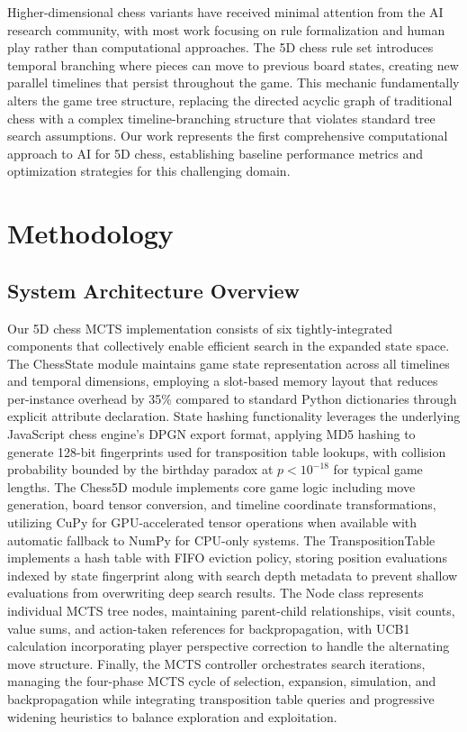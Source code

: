 \documentclass{article}
\begin{document}
Higher-dimensional chess variants have received minimal attention from the AI research community, with most work focusing on rule formalization and human play rather than computational approaches. The 5D chess rule set introduces temporal branching where pieces can move to previous board states, creating new parallel timelines that persist throughout the game. This mechanic fundamentally alters the game tree structure, replacing the directed acyclic graph of traditional chess with a complex timeline-branching structure that violates standard tree search assumptions. Our work represents the first comprehensive computational approach to AI for 5D chess, establishing baseline performance metrics and optimization strategies for this challenging domain.


\section{Methodology}

\subsection{System Architecture Overview}

Our 5D chess MCTS implementation consists of six tightly-integrated components that collectively enable efficient search in the expanded state space. The ChessState module maintains game state representation across all timelines and temporal dimensions, employing a slot-based memory layout that reduces per-instance overhead by 35\% compared to standard Python dictionaries through explicit attribute declaration. State hashing functionality leverages the underlying JavaScript chess engine's DPGN export format, applying MD5 hashing to generate 128-bit fingerprints used for transposition table lookups, with collision probability bounded by the birthday paradox at $p < 10^{-18}$ for typical game lengths. The Chess5D module implements core game logic including move generation, board tensor conversion, and timeline coordinate transformations, utilizing CuPy for GPU-accelerated tensor operations when available with automatic fallback to NumPy for CPU-only systems. The TranspositionTable implements a hash table with FIFO eviction policy, storing position evaluations indexed by state fingerprint along with search depth metadata to prevent shallow evaluations from overwriting deep search results. The Node class represents individual MCTS tree nodes, maintaining parent-child relationships, visit counts, value sums, and action-taken references for backpropagation, with UCB1 calculation incorporating player perspective correction to handle the alternating move structure. Finally, the MCTS controller orchestrates search iterations, managing the four-phase MCTS cycle of selection, expansion, simulation, and backpropagation while integrating transposition table queries and progressive widening heuristics to balance exploration and exploitation.
\end{document}
